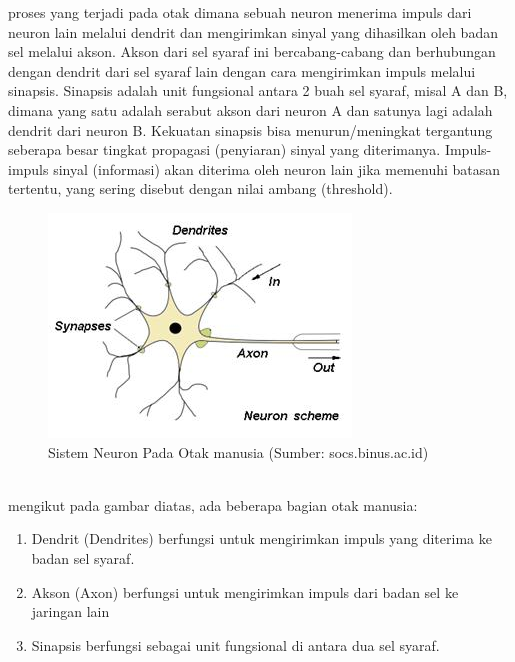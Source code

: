 \begin{enumerate}
    proses yang terjadi pada otak dimana sebuah neuron menerima impuls dari neuron lain melalui dendrit dan mengirimkan sinyal yang dihasilkan oleh badan sel melalui akson. Akson dari sel syaraf ini bercabang-cabang dan berhubungan dengan dendrit dari sel syaraf lain dengan cara mengirimkan impuls melalui sinapsis. Sinapsis adalah unit fungsional antara 2 buah sel syaraf, misal A dan B, dimana yang satu adalah serabut akson dari neuron A dan satunya lagi adalah dendrit dari neuron B. Kekuatan sinapsis bisa menurun/meningkat tergantung seberapa besar tingkat propagasi (penyiaran) sinyal yang diterimanya. Impuls-impuls sinyal (informasi) akan diterima oleh neuron lain jika memenuhi batasan tertentu, yang sering disebut dengan nilai ambang (threshold).
    \begin{figure} [ht] \centering
      \includegraphics[scale=0.9]{gambar/neuron.jpg}
      \caption{Sistem Neuron Pada Otak manusia (Sumber: socs.binus.ac.id)}
      \label{fig:MechineLearning}
    \end{figure}\\
    mengikut pada gambar diatas, ada beberapa bagian otak manusia:
    \begin{enumerate}[nolistsep]
      \item Dendrit (Dendrites) berfungsi untuk mengirimkan impuls yang diterima ke badan sel syaraf.
      \item Akson (Axon) berfungsi untuk mengirimkan impuls dari badan sel ke jaringan lain
      \item Sinapsis berfungsi sebagai unit fungsional di antara dua sel syaraf.
    \end{enumerate}
\end{enumerate}

